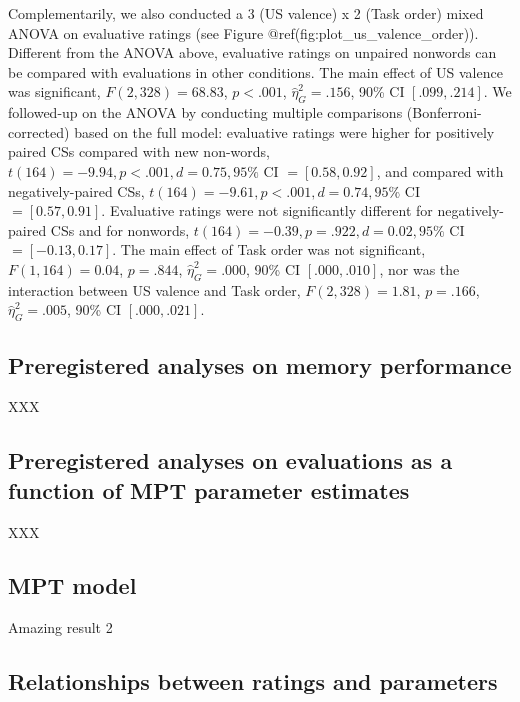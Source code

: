 \documentclass[
  man,floatsintext]{apa6}
\begin{document}
Complementarily, we also conducted a 3 (US valence) x 2 (Task order) mixed ANOVA on evaluative ratings (see Figure @ref(fig:plot\_us\_valence\_order)). Different from the ANOVA above, evaluative ratings on unpaired nonwords can be compared with evaluations in other conditions. The main effect of US valence was significant, \(F(2, 328) = 68.83\), \(p < .001\), \(\hat{\eta}^2_G = .156\), 90\% CI \([.099, .214]\). We followed-up on the ANOVA by conducting multiple comparisons (Bonferroni-corrected) based on the full model: evaluative ratings were higher for positively paired CSs compared with new non-words, \(t(164) = -9.94, p < .001, d = 0.75, 95\%\) CI \(= [0.58, 0.92]\), and compared with negatively-paired CSs, \(t(164) = -9.61, p < .001, d = 0.74, 95\%\) CI \(= [0.57, 0.91]\). Evaluative ratings were not significantly different for negatively-paired CSs and for nonwords, \(t(164) = -0.39, p = .922, d = 0.02, 95\%\) CI \(= [-0.13, 0.17]\). The main effect of Task order was not significant, \(F(1, 164) = 0.04\), \(p = .844\), \(\hat{\eta}^2_G = .000\), 90\% CI \([.000, .010]\), nor was the interaction between US valence and Task order, \(F(2, 328) = 1.81\), \(p = .166\), \(\hat{\eta}^2_G = .005\), 90\% CI \([.000, .021]\).

\hypertarget{preregistered-analyses-on-memory-performance}{%
\subsection{Preregistered analyses on memory performance}\label{preregistered-analyses-on-memory-performance}}

XXX

\hypertarget{preregistered-analyses-on-evaluations-as-a-function-of-mpt-parameter-estimates}{%
\subsection{Preregistered analyses on evaluations as a function of MPT parameter estimates}\label{preregistered-analyses-on-evaluations-as-a-function-of-mpt-parameter-estimates}}

XXX

\hypertarget{mpt-model}{%
\subsection{MPT model}\label{mpt-model}}

Amazing result 2

\hypertarget{relationships-between-ratings-and-parameters}{%
\subsection{Relationships between ratings and parameters}\label{relationships-between-ratings-and-parameters}}
\end{document}
